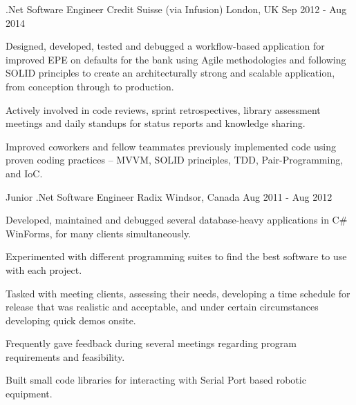 \begin{cventries}
  \cventry
    {.Net Software Engineer} %
    {Credit Suisse (via Infusion)} %
    {London, UK} %
    {Sep 2012 - Aug 2014} %
    {
      \begin{cvitems} %
        \item {Designed, developed, tested and debugged a workflow-based application for improved EPE on defaults for the bank using Agile methodologies and following SOLID principles to create an architecturally strong and scalable application, from conception through to production.}
        \item {Actively involved in code reviews, sprint retrospectives, library assessment meetings and daily standups for status reports and knowledge sharing.}
        \item {Improved coworkers and fellow teammates previously implemented code using proven coding practices – MVVM, SOLID principles, TDD, Pair-Programming, and IoC.}
      \end{cvitems}
    }

  \cventry
    {Junior .Net Software Engineer} %
    {Radix} %
    {Windsor, Canada} %
    {Aug 2011 - Aug 2012} %
    {
      \begin{cvitems} %
        \item {Developed, maintained and debugged several database-heavy applications in C\# WinForms, for many clients simultaneously.}
        \item {Experimented with different programming suites to find the best software to use with each project.}
        \item {Tasked with meeting clients, assessing their needs, developing a time schedule for release that was realistic and acceptable, and under certain circumstances developing quick demos onsite.}
        \item {Frequently gave feedback during several meetings regarding program requirements and feasibility.}
        \item {Built small code libraries for interacting with Serial Port based robotic equipment.}
      \end{cvitems}
    }

\end{cventries}

